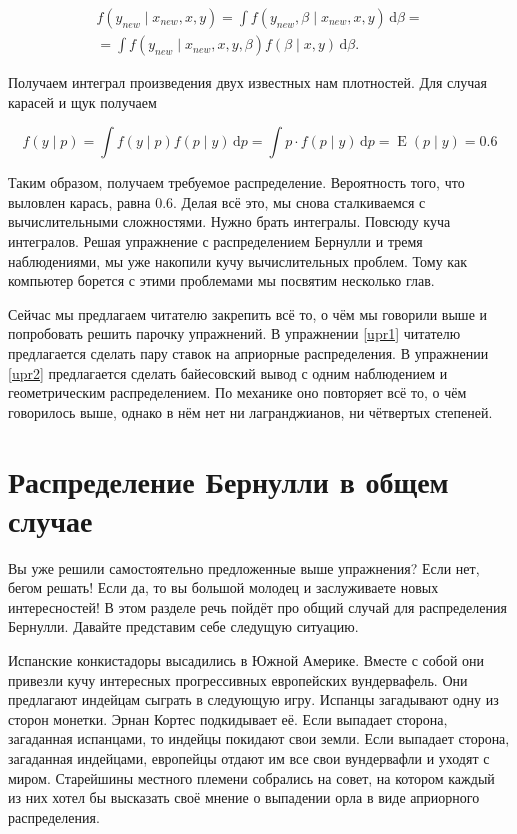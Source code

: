\documentclass[12pt, a4paper, oneside]{extreport}
\DeclareMathOperator{\E}{\mathop{E}}
\def \b{\beta}
\newcommand{\dx}[1]{\,\mathrm{d}#1} %
\theoremstyle{plain}              %
\theoremstyle{definition}         %
\begin{document}
\begin{multline*}
f(y_{new} \mid x_{new},x, y) =\int f(y_{new}, \b \mid x_{new}, x,y) \dx{\b} = \\ =  \int f(y_{new} \mid x_{new}, x,y,\b) f(\b \mid x,y) \dx{\b}.
\end{multline*}


Получаем интеграл произведения двух известных нам плотностей. Для случая карасей и щук получаем

\[    
f(y \mid p) = \int f(y \mid p) f(p \mid y) \dx{p} = \int p \cdot f(p \mid y) \dx{p} = \E(p \mid y) = 0.6
\]

Таким образом, получаем требуемое распределение. Вероятность того, что выловлен карась, равна $0.6$. Делая всё это, мы снова сталкиваемся с вычислительными сложностями. Нужно брать интегралы. Повсюду куча интегралов. Решая упражнение с распределением Бернулли и тремя наблюдениями, мы уже накопили кучу вычислительных проблем. Тому как компьютер борется с этими проблемами мы посвятим несколько глав.

Сейчас мы предлагаем читателю закрепить всё то, о чём мы говорили выше и попробовать решить парочку упражнений. В упражнении \ref{upr1}  читателю предлагается сделать пару ставок на априорные распределения. В упражнении \ref{upr2} предлагается сделать байесовский вывод с одним наблюдением и геометрическим распределением. По механике оно повторяет всё то, о чём говорилось выше, однако в нём нет ни лагранджианов, ни чётвертых степеней. 

\section{Распределение Бернулли в общем случае} 

Вы уже решили самостоятельно предложенные выше упражнения? Если нет, бегом решать! Если да, то вы большой молодец и заслуживаете новых интересностей! В этом разделе речь пойдёт про общий случай для распределения Бернулли. Давайте представим себе следущую ситуацию. 

Испанские конкистадоры высадились в Южной Америке. Вместе с собой они привезли кучу интересных прогрессивных европейских вундервафель. Они предлагают индейцам сыграть в следующую игру. Испанцы загадывают одну из сторон монетки. Эрнан Кортес подкидывает её. Если выпадает сторона, загаданная испанцами, то индейцы покидают свои земли. Если выпадает сторона, загаданная индейцами, европейцы отдают им все свои вундервафли и уходят с миром. Старейшины местного племени собрались на совет, на котором каждый из них хотел бы высказать своё мнение о выпадении орла в виде априорного распределения. 
\end{document}

